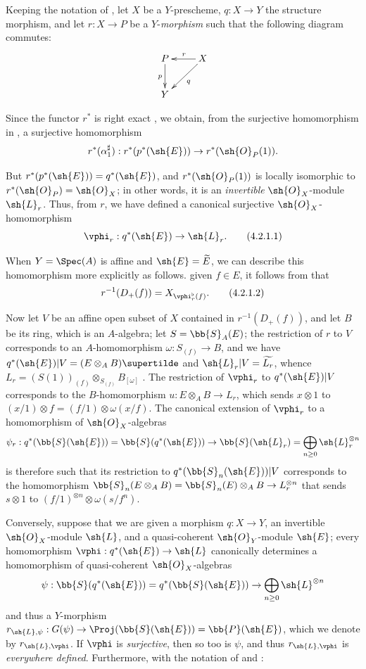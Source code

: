 \begin{env}[4.2.1]
\label{II.4.2.1}
Keeping the notation of , let $X$ be a $Y$-prescheme, $q:X\to Y$ the structure morphism, and let $r:X\to P$ be a $Y$-\emph{morphism} such that the following diagram commutes:
\[
  \xymatrix{
    P \ar[d]_p & X \ar[l]_r \ar[dl]^q
  \\Y
  }
\]

Since the functor $r^*$ is right exact , we obtain, from the surjective homomorphism in , a surjective homomorphism
\[
  r^*(\alpha_1^\sharp): r^*(p^*(\sh{E})) \to r^*(\sh{O}_P(1)).
\]

But $r^*(p^*(\sh{E}))=q^*(\sh{E})$, and $r^*(\sh{O}_P(1))$ is locally isomorphic to $r^*(\sh{O}_P)=\sh{O}_X$; in other words, it is an \emph{invertible} $\sh{O}_X$-module $\sh{L}_r$. Thus, from $r$, we have defined a canonical surjective $\sh{O}_X$-homomorphism
\[
\label{II.4.2.1.1}
  \vphi_r:q^*(\sh{E}) \to \sh{L}_r.
  \tag{4.2.1.1}
\]

When $Y=\Spec(A)$ is affine and $\sh{E}=\widetilde{E}$, we can describe this homomorphism more explicitly as follows.
given $f\in E$, it follows from  that
\[
\label{II.4.2.1.2}
  r^{-1}(D_+(f)) = X_{\vphi_r^\flat(f)}.
  \tag{4.2.1.2}
\]

Now let $V$ be an affine open subset of $X$ contained in $r^{-1}(D_+(f))$, and let $B$ be its ring, which is an $A$-algebra;
let $S=\bb{S}_A(E)$;
the restriction of $r$ to $V$ corresponds to an $A$-homomorphism $\omega:S_{(f)}\to B$, and we have $q^*(\sh{E})|V = (E\otimes_A B)\supertilde$ and $\sh{L}_r|V = \widetilde{L_r}$, whence $L_r = (S(1))_{(f)}\otimes_{S_{(f)}}B_{[\omega]}$ .
The restriction of $\vphi_r$ to $q^*(\sh{E})|V$ corresponds to the $B$-homomorphism $u:E\otimes_A B\to L_r$, which sends $x\otimes1$ to $(x/1)\otimes f = (f/1)\otimes\omega(x/f)$.
The canonical extension of $\vphi_r$ to a homomorphism of $\sh{O}_X$-algebras
\[
  \psi_r: q^*(\bb{S}(\sh{E})) = \bb{S}(q^*(\sh{E})) \to \bb{S}(\sh{L}_r) = \bigoplus_{n\geq0}\sh{L}_r^{\otimes n}
\]
is therefore such that its restriction to $q^*(\bb{S}_n(\sh{E}))|V$ corresponds to the homomorphism $\bb{S}_n(E\otimes_A B) = \bb{S}_n(E)\otimes_A B \to L_r^{\otimes n}$ that sends $s\otimes1$ to $(f/1)^{\otimes n}\otimes\omega(s/f^n)$.
\end{env}

\begin{env}[4.2.2]
\label{II.4.2.2}
Conversely, suppose that we are given a morphism $q:X\to Y$, an invertible $\sh{O}_X$-module $\sh{L}$, and a quasi-coherent $\sh{O}_Y$-module $\sh{E}$;
every homomorphism $\vphi:q^*(\sh{E})\to\sh{L}$ canonically determines a homomorphism of quasi-coherent $\sh{O}_X$-algebras
\[
  \psi: \bb{S}(q^*(\sh{E})) = q^*(\bb{S}(\sh{E})) \to \bigoplus_{n\geq0}\sh{L}^{\otimes n}
\]
and thus  a $Y$-morphism $r_{\sh{L},\psi}:G(\psi)\to\Proj(\bb{S}(\sh{E}))=\bb{P}(\sh{E})$, which we denote by $r_{\sh{L},\vphi}$.
If $\vphi$ is \emph{surjective}, then so too is $\psi$, and thus  $r_{\sh{L},\vphi}$ is \emph{everywhere defined}.
Furthermore, with the notation of  and :
\end{env}

